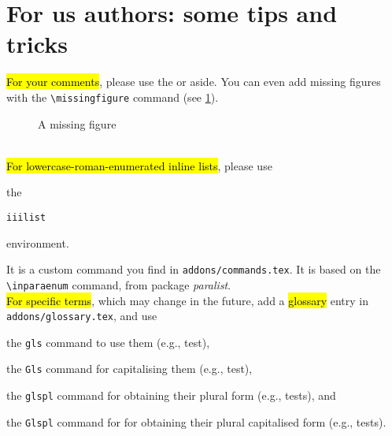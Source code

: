 %
\section*{For us authors: some tips and tricks}
\label{sec:memo}
%
%
\hl{For your comments}, please use the
or aside.
%
You can even add missing figures with the \verb|\missingfigure| command (see \cref{fig:example:missing:figure}).
\begin{figure}[b]
\caption{A missing figure}
\label{fig:example:missing:figure}
\end{figure}
%
\\
%
%
\hl{For lowercase-roman-enumerated inline lists}, please use
\begin{iiilist}
\item the
\item \texttt{iiilist}
\item environment.
\end{iiilist}
It is a custom command you find in \verb|addons/commands.tex|. It is based on the \verb|\inparaenum| command, from package \textit{paralist}.
%
\\
%
%
\hl{For specific terms}, which may change in the future, add a \hl{glossary} entry in \texttt{addons/glossary.tex},
and use
\begin{iiilist}
\item the \texttt{gls} command to use them (e.g., \gls{test}),
\item the \texttt{Gls} command for capitalising them (e.g., \Gls{test}),
\item the \texttt{glspl} command for obtaining their plural form (e.g., \glspl{test}), and
\item the \texttt{Glspl} command for for obtaining their plural capitalised form (e.g., \Glspl{test}).
\end{iiilist}
